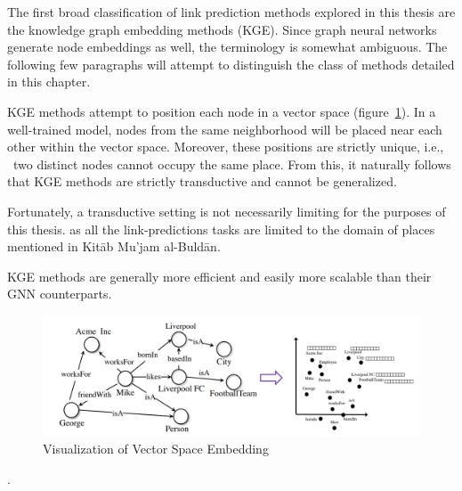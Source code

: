 The first broad classification of link prediction methods explored in this thesis are the knowledge graph embedding methods (KGE).
Since graph neural networks generate node embeddings as well, the terminology is somewhat ambiguous.
The following few paragraphs will attempt to distinguish the class of methods detailed in this chapter.

KGE methods attempt to position each node in a vector space (figure~\ref{fig:vec-space-vis}).
In a well-trained model, nodes from the same neighborhood will be placed near each other within the vector space.
Moreover, these positions are strictly unique, i.e., \ two distinct nodes cannot occupy the same place.
From this, it naturally follows that KGE methods are strictly transductive and cannot be generalized.

Fortunately, a transductive setting is not necessarily limiting for the purposes of this thesis.
as all the link-predictions tasks are limited
to the domain of places mentioned in Kitāb Mu'jam al-Buldān.

KGE methods are generally more efficient and easily more scalable than their GNN counterparts.


\begin{figure}[h] %
    \centering %
    \includegraphics[width=1\linewidth]{figures/vector-space} %
    \caption{Visualization of Vector Space Embedding~\cite{KGETutorial}} %
    \label{fig:vec-space-vis} %
\end{figure}.